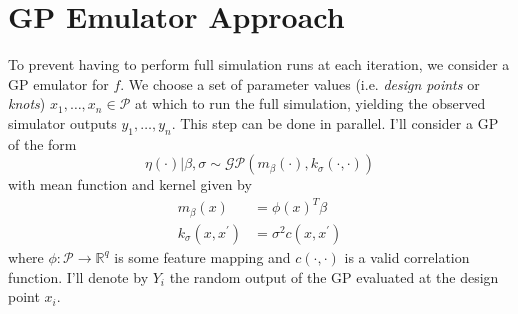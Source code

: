 \documentclass[12pt]{article}
\newcommand{\R}{\mathcal{R}}
\def\R{\mathbb{R}}
\begin{document}
\section{GP Emulator Approach}
To prevent having to perform full simulation runs at each iteration, we consider a GP emulator for $f$. We choose a set of parameter values (i.e. \textit{design points} or \textit{knots}) $x_1, \dots, x_n \in \mathcal{P}$ at which to run the full simulation, yielding the observed simulator outputs $y_1, \dots, y_n$. This step can be done in parallel. I'll consider a GP of the form 
\[\eta(\cdot)|\beta, \sigma \sim \mathcal{GP}(m_\beta(\cdot), k_\sigma(\cdot, \cdot))\]
with mean function and kernel given by 
\begin{align*}
m_\beta(x) &= \phi(x)^T \beta \\
k_{\sigma}(x, x^\prime) &= \sigma^2 c(x, x^\prime)
\end{align*}
where $\phi: \mathcal{P} \to \R^q$ is some feature mapping and $c(\cdot, \cdot)$ is a valid correlation function. I'll denote by $Y_i$ the random output of the GP evaluated at the design point $x_i$. 
\end{document}

